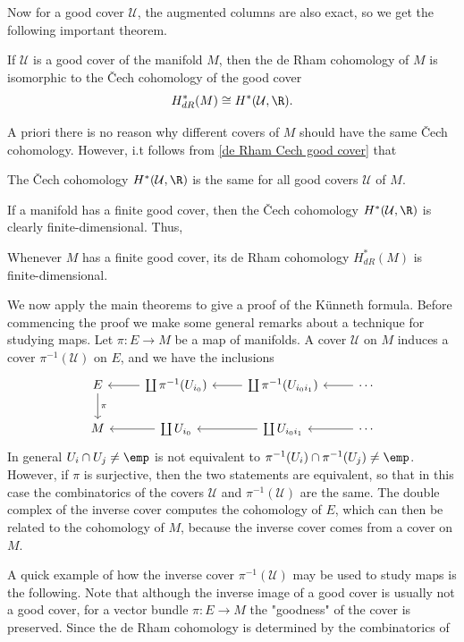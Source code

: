 Now for a good cover $\mathcal{U}$, the augmented columns are also exact, so we get the following important theorem.
\begin{theorem}\label{de Rham Cech good cover}
If $\mathcal{U}$ is a good cover of the manifold $M$, then the de Rham cohomology of $M$ is isomorphic to the \v{C}ech cohomology of the good cover
\[H^*_{dR}(M)\cong H^*(\mathcal{U},\R).\]
\end{theorem}
A priori there is no reason why different covers of $M$ should have the same \v{C}ech cohomology. However, i.t follows from \cref{de Rham Cech good cover} that
\begin{corollary}
The \v{C}ech cohomology $H^*(\mathcal{U},\R)$ is the same for all good covers $\mathcal{U}$ of $M$.
\end{corollary}
If a manifold has a finite good cover, then the \v{C}ech cohomology $H^*(\mathcal{U},\R)$ is clearly finite-dimensional. Thus,
\begin{corollary}
Whenever $M$ has a finite good cover, its de Rham cohomology $H^*_{dR}(M)$ is finite-dimensional.
\end{corollary}
We now apply the main theorems to give a proof of the K\"unneth formula. Before commencing the proof we make some general remarks about a technique for studying maps. 
Let $\pi:E\to M$ be a map of manifolds. A cover $\mathcal{U}$ on $M$ induces a cover $\pi^{-1}(\mathcal{U})$ on $E$, and we have the inclusions
\[\begin{tikzcd}
E\ar[d,"\pi"]&\coprod\pi^{-1}(U_{i_0})\ar[l]&\coprod\pi^{-1}(U_{i_0i_1})\ar[l]&\cdots\ar[l]\\
M&\coprod U_{i_0}\ar[l]&\coprod U_{i_0i_1}\ar[l]&\cdots\ar[l]
\end{tikzcd}\]
In general $U_i\cap U_j\neq\emp$ is not equivalent to $\pi^{-1}(U_i)\cap \pi^{-1}(U_j)\neq\emp$. However, if $\pi$ is surjective, then the two statements are equivalent, 
so that in this case the combinatorics of the covers $\mathcal{U}$ and $\pi^{-1}(\mathcal{U})$ are the same. The double complex of the inverse cover computes the cohomology 
of $E$, which can then be related to the cohomology of $M$, because the inverse cover comes from a cover on $M$.\par
A quick example of how the inverse cover $\pi^{-1}(\mathcal{U})$ may be used to study maps is the following. Note that although the inverse image of a good cover is 
usually not a good cover, for a vector bundle $\pi:E\to M$ the "goodness" of the cover is preserved. Since the de Rham cohomology is determined by the combinatorics of 
